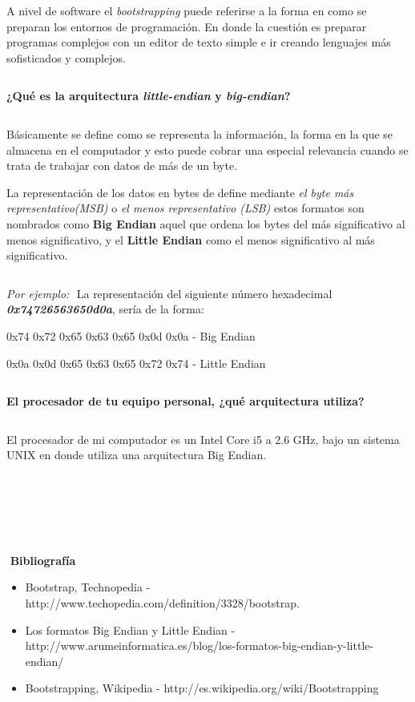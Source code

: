 \documentclass[11pt,a4paper]{article}
\begin{document}
A nivel de software el \textit{bootstrapping} puede referirse a la forma en como se preparan los entornos de programación. En donde la cuestión es preparar programas complejos con un editor de texto simple e ir creando lenguajes más sofisticados y complejos.

$ $

\textbf{¿Qué es la arquitectura \textit{little-endian} y\textit{ big-endian}?}
 
 $ $

Básicamente se define como se representa la información, la forma en la que se almacena en el computador y esto puede cobrar una especial relevancia cuando se trata de trabajar con datos de más de un byte.

La representación de los datos en bytes de define mediante \textit{el byte más representativo(MSB)} o \textit{el menos representativo (LSB)} estos formatos son nombrados como \textbf{Big Endian} aquel que ordena los bytes del más significativo al menos significativo, y el \textbf{Little Endian} como el menos significativo al más significativo. 

$ $

\emph{Por ejemplo:}
$ $
La representación del siguiente número hexadecimal  \textbf{\textit{0x74726563650d0a}}, sería de la forma:
$ $
\begin{center}
0x74 0x72 0x65 0x63 0x65 0x0d 0x0a - Big Endian


0x0a 0x0d 0x65 0x63 0x65 0x72 0x74 - Little Endian
\end{center}

$ $

\textbf{El procesador de tu equipo personal, ¿qué arquitectura utiliza?}
 
 $ $
 
 El procesador de mi computador es un Intel Core i5 a 2.6 GHz, bajo un sistema UNIX en donde utiliza una arquitectura Big Endian.
 
 $ $
 
 $ $

 $ $

 $ $
 
 $ $
 
 $ $

 $ $

 $ $
\textbf{Bibliografía}
 
\begin{itemize}
		\item Bootstrap, Technopedia - http://www.techopedia.com/definition/3328/bootstrap.
		\item Los formatos Big Endian y Little Endian - http://www.arumeinformatica.es/blog/los-formatos-big-endian-y-little-endian/
		\item Bootstrapping, Wikipedia - http://es.wikipedia.org/wiki/Bootstrapping
	\end{itemize} 
 
\end{document}

